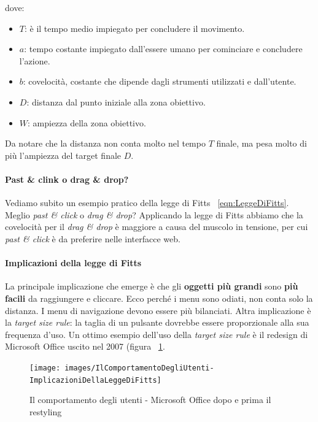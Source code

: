					dove:
					\begin{itemize}
						\item $T$: è il tempo medio impiegato per concludere il movimento.
						\item $a$: tempo costante impiegato dall'essere umano per cominciare e concludere l'azione.
						\item $b$: covelocità, costante che dipende dagli strumenti utilizzati e dall'utente.
						\item $D$: distanza dal punto iniziale alla zona obiettivo.
						\item $W$: ampiezza della zona obiettivo.
					\end{itemize}
					Da notare che la distanza non conta molto nel tempo $T$ finale, ma pesa molto di più l'ampiezza del target finale $D$.
			
				\paragraph{Past \& clink o drag \& drop?}
					Vediamo subito un esempio pratico della legge di Fitts ~\ref{eqn:LeggeDiFitts}. Meglio \emph{past \& click} o \emph{drag \& drop}? Applicando la legge di Fitts abbiamo che la covelocità per il \emph{drag \& drop} è maggiore a causa del muscolo in tensione, per cui \emph{past \& click} è da preferire nelle interfacce web.
			
				\paragraph{Implicazioni della legge di Fitts}
					La principale implicazione che emerge è che gli \textbf{oggetti più grandi} sono \textbf{più facili} da raggiungere e cliccare. Ecco perché i menu sono odiati, non conta solo la distanza. I menu di navigazione devono essere più bilanciati. Altra implicazione è la \emph{target size rule}: la taglia di un pulsante dovrebbe essere proporzionale alla sua frequenza d'uso. Un ottimo esempio dell'uso della \emph{target size rule} è il redesign di Microsoft Office uscito nel 2007 (figura ~\ref{fig:ImplicazioniDellaLeggeDiFitts}.
					
					\begin{figure} [h]
						\centering
						\texttt{[image: images/IlComportamentoDegliUtenti-ImplicazioniDellaLeggeDiFitts]}
						\caption[Il comportamento degli utenti - Microsoft Office dopo e prima il restyling]{Il comportamento degli utenti - Microsoft Office dopo e prima il restyling}
						\label{fig:ImplicazioniDellaLeggeDiFitts}
					\end{figure}
				
